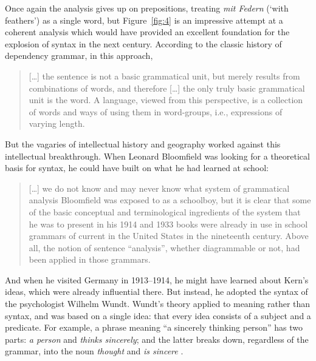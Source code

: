 \documentclass[output=paper
 	        ,biblatex
                ,babelshorthands
                ,newtxmath
                ,draftmode
                ,colorlinks, citecolor=brown
]{langscibook}
\begin{document}
Once again the analysis gives up on prepositions, treating \emph{mit Federn} (‘with feathers’) as a single word, but Figure~\ref{fig:4} is an impressive attempt at a coherent analysis which would have provided an excellent foundation for the explosion of syntax in the next century. According to the classic history of dependency grammar, in this approach,

\begin{quotation}
	[\dots] the sentence is not a basic grammatical unit, but merely results from combinations of words, and therefore [\dots] the only truly basic grammatical unit is the word. A language, viewed from this perspective, is a collection of words and ways of using them in word-groups, i.e., expressions of varying length. \citep[21]{Percival1976}
\end{quotation}

But the vagaries of intellectual history and geography worked against this intellectual breakthrough. When Leonard Bloomfield was looking for a theoretical basis for syntax, he could have built on what he had learned at school:

\begin{quotation}
	[\dots] we do not know and may never know what system of grammatical analysis Bloomfield was exposed to as a schoolboy, but it is clear that some of the basic conceptual and terminological ingredients of the system that he was to present in his 1914 and 1933 books were already in use in school grammars of  current in the United States in the nineteenth century. Above all, the notion of sentence ``analysis'', whether diagrammable or not, had been applied in those grammars. \citep[18]{Percival1976}
\end{quotation}

And when he visited Germany in 1913--1914, he might have learned about Kern’s ideas, which were already influential there. But instead, he adopted the syntax of the  psychologist Wilhelm Wundt. Wundt’s theory applied to meaning rather than syntax, and was based on a single idea: that every idea consists of a subject and a predicate. For example, a phrase meaning ``a sincerely thinking person'' has two parts: \emph{a person} and \emph{thinks sincerely}; and the latter breaks down, regardless of the grammar, into the noun \emph{thought} and \emph{is sincere} \citep{Percival1976}.
\end{document}
